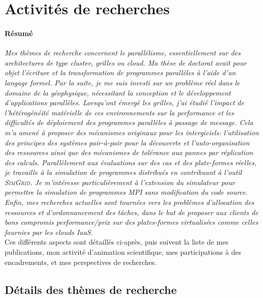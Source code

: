 \documentclass[11pt]{article}
\begin{document}
\section{Activités de recherches}

\paragraph{Résumé}
\textit{Mes   thèmes    de   recherche   concernent    le   \emph{parallélisme},
  essentiellement  sur  des architectures  de  type  cluster, \emph{grilles}  ou
  \emph{cloud}.   Ma  thèse  de  doctorat  avait pour  objet  l'écriture  et  la
  transformation de programmes parallèles à  l'aide d'un langage formel.  Par la
  suite,  je  me suis  investi  sur  un problème  réel  dans  le domaine  de  la
  géophysique,  nécessitant la  conception  et  le développement  d'applications
  parallèles.   Lorsqu'ont   émergé  les   grilles,  j'ai  étudié   l'impact  de
  l'hétérogénéité matérielle  de ces  environnements sur  la performance  et les
  difficultés de  déploiement des  programmes parallèles  à passage  de message.
  Cela  m'a amené  à proposer  des mécanismes  originaux pour  les intergiciels:
  l'utilisation des  principes des  systèmes pair-à-pair  pour la  découverte et
  l'auto-organisation des ressources  ainsi que des mécanismes  de tolérance aux
  pannes par réplication des calculs.  Parallèlement aux évaluations sur des cas
  et  des plate-formes  réelles,  je  travaille à  la  simulation de  programmes
  distribués  en   contribuant  à  l'outil  \textsc{SimGrid}.    Je  m'intéresse
  particulièrement à l'extension  du simulateur pour permettre  la simulation de
  programmes  MPI  sans modification  du  code  source.  Enfin,  mes  recherches
  actuelles  sont tournées  vers les  problèmes d'allocation  des ressources  et
  d'ordonnancement  des tâches,  dans le  but de  proposer aux  clients de  bons
  compromis  performance/prix sur  des plates-formes  virtualisées comme  celles
  fournies par les clouds IaaS.}\\

Ces différents  aspects sont détaillés  ci-après, puis  suivent la liste  de mes
publications, mon  activité d'animation  scientifique, mes participations  à des
encadrements, et mes perspectives de recherches.

\subsection{Détails des thèmes de recherche}
\end{document}
